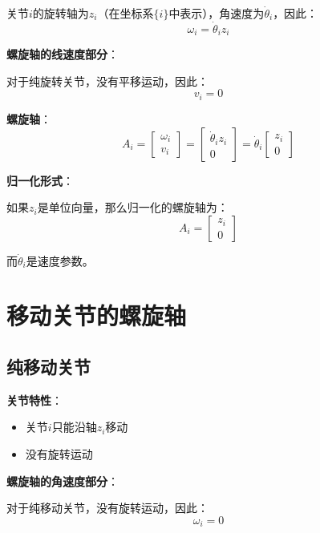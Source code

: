 \documentclass[12pt,a4paper]{article}
\begin{document}
关节$i$的旋转轴为$z_i$（在坐标系$\{i\}$中表示），角速度为$\dot{\theta}_i$，因此：
\begin{equation}
\omega_i = \dot{\theta}_i z_i
\end{equation}

\textbf{螺旋轴的线速度部分}：

对于纯旋转关节，没有平移运动，因此：
\begin{equation}
v_i = 0
\end{equation}

\textbf{螺旋轴}：
\begin{equation}
A_i = \begin{bmatrix} \omega_i \\ v_i \end{bmatrix} = \begin{bmatrix} \dot{\theta}_i z_i \\ 0 \end{bmatrix} = \dot{\theta}_i \begin{bmatrix} z_i \\ 0 \end{bmatrix}
\end{equation}

\textbf{归一化形式}：

如果$z_i$是单位向量，那么归一化的螺旋轴为：
\begin{equation}
A_i = \begin{bmatrix} z_i \\ 0 \end{bmatrix}
\end{equation}

而$\dot{\theta}_i$是速度参数。

\section{移动关节的螺旋轴}

\subsection{纯移动关节}

\textbf{关节特性}：
\begin{itemize}
\item 关节$i$只能沿轴$z_i$移动
\item 没有旋转运动
\end{itemize}

\textbf{螺旋轴的角速度部分}：

对于纯移动关节，没有旋转运动，因此：
\begin{equation}
\omega_i = 0
\end{equation}
\end{document}

